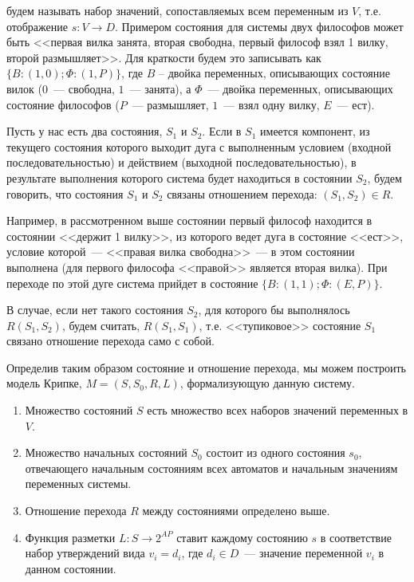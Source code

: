 будем называть набор значений, сопоставляемых всем переменным из
$V$, т.е. отображение $s\colon V \rightarrow D$. Примером состояния для системы двух
философов может быть <<первая вилка занята, вторая свободна, первый философ взял 1 вилку,
второй размышляет>>. Для краткости будем это записывать как $\{B: (1, 0); \Phi: (1, P)\}$,
где $B$ -- двойка переменных, описывающих состояние вилок ($0$~--- свободна, $1$~---
занята), а $\Phi$~--- двойка переменных, описывающих состояние философов ($P$~---
размышляет, $1$~--- взял одну вилку, $E$~--- ест).

Пусть у нас есть два состояния, $S_1$ и $S_2$. Если в $S_1$ имеется компонент, из текущего
состояния которого выходит дуга с выполненным условием (входной последовательностью) и
действием (выходной последовательностью), в результате выполнения которого система будет
находиться в состоянии $S_2$, будем говорить, что состояния $S_1$ и $S_2$ связаны
отношением перехода: $(S_1, S_2) \in R$.

Например, в рассмотренном выше состоянии первый философ находится в состоянии <<держит 1
вилку>>, из которого ведет дуга в состояние <<ест>>, условие которой~--- <<правая вилка
свободна>>~--- в этом состоянии выполнена (для первого философа <<правой>> является вторая
вилка). При переходе по этой дуге система прийдет в состояние $\{B: (1, 1); \Phi: (E,
P)\}$.

В случае, если нет такого состояния $S_2$, для которого бы выполнялось $R(S_1, S_2)$,
будем считать, $R(S_1, S_1)$, т.е. <<тупиковое>> состояние $S_1$ связано отношение
перехода само с собой.

Определив таким образом состояние и отношение перехода, мы можем построить модель Крипке,
$M = (S, S_0, R, L)$, формализующую данную систему.
\begin{enumerate}
\item Множество состояний $S$ есть множество всех наборов значений переменных в $V$.
\item Множество начальных состояний $S_0$ состоит из одного состояния $s_0$, отвечающего
  начальным состояниям всех автоматов и начальным значениям переменных системы.
\item Отношение перехода $R$ между состояниями определено выше.
\item Функция разметки $L\colon S \rightarrow 2^{AP}$ ставит каждому состоянию $s$ в
  соответствие набор утверждений вида $v_i = d_i$, где $d_i \in D$~--- значение переменной
  $v_i$ в данном состоянии.
\end{enumerate}

